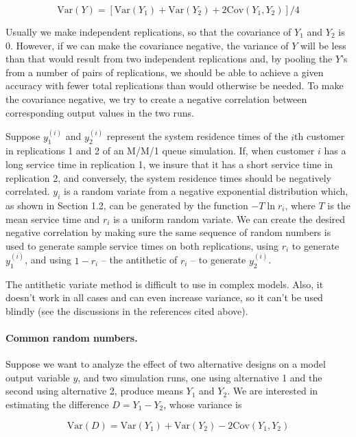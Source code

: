 \begin{equation}
\mathrm{Var}(Y) = [\mathrm{Var}(Y_1) + \mathrm{Var}(Y_2) + 2\mathrm{Cov}(Y_1,Y_2)]/4
\label{eq:output-antithetic}
\end{equation}

Usually we make independent replications, so that the covariance of $Y_1$ and
$Y_2$ is 0. However, if we can make the covariance negative, the variance of $Y$
will be less than that would result from two independent replications and, by
pooling the $Y$'s from a number of pairs of replications, we should be able to
achieve a given accuracy with fewer total replications than would otherwise be
needed. To make the covariance negative, we try to create a negative
correlation between corresponding output values in the two runs.

Suppose $y_1^{(i)}$ and $y_2^{(i)}$ represent the system residence times of the
$i$th customer in replications 1 and 2 of an M/M/1 queue simulation. If, when
customer $i$ has a long service time in replication 1, we insure that it has a
short service time in replication 2, and conversely, the system residence times
should be negatively correlated. $y_i$ is a random variate from a negative
exponential distribution which, as shown in Section 1.2, can be generated by
the function $-T \ln r_i$, where $T$ is the mean service time and $r_i$ is a
uniform random variate. We can create the desired negative correlation by
making sure the same sequence of random numbers is used to generate sample
service times on both replications, using $r_i$ to generate $y_1^{(i)}$, and
using $1-r_i$ -- the antithetic of $r_i$ -- to generate $y_2^{(i)}$.

The antithetic variate method is difficult to use in complex models. Also, it
doesn't work in all cases and can even increase variance, so it can't be used
blindly (see the discussions in the references cited above).

\paragraph{Common random numbers.}
Suppose we want to analyze the effect of two alternative designs on a model
output variable $y$, and two simulation runs, one using alternative 1 and the
second using alternative 2, produce means $Y_1$ and $Y_2$. We are interested in
estimating the difference $D = Y_1 - Y_2$, whose variance is

\begin{equation}
\mathrm{Var}(D) = \mathrm{Var}(Y_1) + \mathrm{Var}(Y_2) - 2\mathrm{Cov}(Y_1,Y_2)
\label{eq:output-common-rn}
\end{equation}

